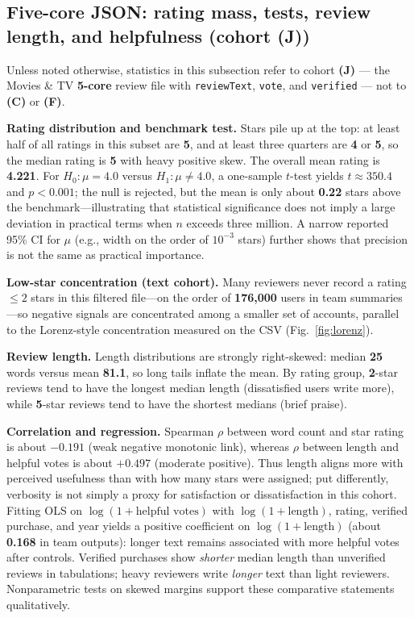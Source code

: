 \documentclass[conference]{IEEEtran}
\begin{document}
\subsection{Five-core JSON: rating mass, tests, review length, and helpfulness (cohort \textbf{(J)})}
Unless noted otherwise, statistics in this subsection refer to cohort \textbf{(J)} --- the Movies \& TV \textbf{5-core} review file with \texttt{reviewText}, \texttt{vote}, and \texttt{verified} --- not to \textbf{(C)} or \textbf{(F)}.

\textbf{Rating distribution and benchmark test.} Stars pile up at the top: at least half of all ratings in this subset are \textbf{5}, and at least three quarters are \textbf{4} or \textbf{5}, so the median rating is \textbf{5} with heavy positive skew. The overall mean rating is \textbf{4.221}. For $H_0:\mu=4.0$ versus $H_1:\mu\neq 4.0$, a one-sample $t$-test yields $t\approx 350.4$ and $p<0.001$; the null is rejected, but the mean is only about \textbf{0.22} stars above the benchmark---illustrating that statistical significance does not imply a large deviation in practical terms when $n$ exceeds three million. A narrow reported 95\% CI for $\mu$ (e.g., width on the order of $10^{-3}$ stars) further shows that precision is not the same as practical importance.

\textbf{Low-star concentration (text cohort).} Many reviewers never record a rating $\leq 2$ stars in this filtered file---on the order of \textbf{176{,}000} users in team summaries---so negative signals are concentrated among a smaller set of accounts, parallel to the Lorenz-style concentration measured on the CSV (Fig.~\ref{fig:lorenz}).

\textbf{Review length.} Length distributions are strongly right-skewed: median \textbf{25} words versus mean \textbf{81.1}, so long tails inflate the mean. By rating group, \textbf{2}-star reviews tend to have the longest median length (dissatisfied users write more), while \textbf{5}-star reviews tend to have the shortest medians (brief praise).

\textbf{Correlation and regression.} Spearman $\rho$ between word count and star rating is about \textbf{$-0.191$} (weak negative monotonic link), whereas $\rho$ between length and helpful votes is about \textbf{$+0.497$} (moderate positive). Thus length aligns more with perceived usefulness than with how many stars were assigned; put differently, verbosity is not simply a proxy for satisfaction or dissatisfaction in this cohort. Fitting OLS on $\log(1+\text{helpful votes})$ with $\log(1+\text{length})$, rating, verified purchase, and year yields a positive coefficient on $\log(1+\text{length})$ (about \textbf{0.168} in team outputs): longer text remains associated with more helpful votes after controls. Verified purchases show \emph{shorter} median length than unverified reviews in tabulations; heavy reviewers write \emph{longer} text than light reviewers. Nonparametric tests on skewed margins support these comparative statements qualitatively.
\end{document}
